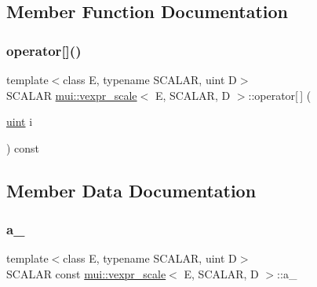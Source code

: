 \subsection{Member Function Documentation}
\mbox{\label{structmui_1_1vexpr__scale_af70986a40768a6a59439df491c6942a1}} 
\subsubsection{\texorpdfstring{operator[]()}{operator[]()}}
{\footnotesize\ttfamily template$<$class E, typename S\+C\+A\+L\+AR, uint D$>$ \\
S\+C\+A\+L\+AR \hyperlink{structmui_1_1vexpr__scale}{mui\+::vexpr\+\_\+scale}$<$ E, S\+C\+A\+L\+AR, D $>$\+::operator\mbox{[}$\,$\mbox{]} (\begin{DoxyParamCaption}\item[{\hyperlink{namespacemui_af15a3e7188a2117fb9965277bb0cacd2}{uint}}]{i }\end{DoxyParamCaption}) const\hspace{0.3cm}{\ttfamily [inline]}}



\subsection{Member Data Documentation}
\mbox{\label{structmui_1_1vexpr__scale_a4a36269f005da6db6f0268ac27d0b7a7}} 
\subsubsection{\texorpdfstring{a\+\_\+}{a\_}}
{\footnotesize\ttfamily template$<$class E, typename S\+C\+A\+L\+AR, uint D$>$ \\
S\+C\+A\+L\+AR const \hyperlink{structmui_1_1vexpr__scale}{mui\+::vexpr\+\_\+scale}$<$ E, S\+C\+A\+L\+AR, D $>$\+::a\+\_\+\hspace{0.3cm}{\ttfamily [protected]}}

\mbox{\label{structmui_1_1vexpr__scale_a7c0ca192334d9cafc190dd8f37324886}} 
